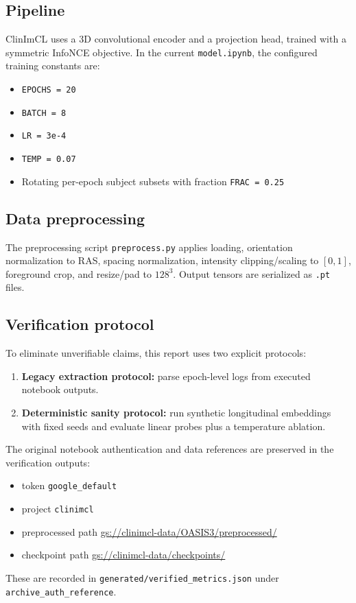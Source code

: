 \documentclass{article}
\begin{document}
\subsection{Pipeline}
ClinImCL uses a 3D convolutional encoder and a projection head, trained with a symmetric InfoNCE objective. In the current \texttt{model.ipynb}, the configured training constants are:
\begin{itemize}
  \item \texttt{EPOCHS = 20}
  \item \texttt{BATCH = 8}
  \item \texttt{LR = 3e-4}
  \item \texttt{TEMP = 0.07}
  \item Rotating per-epoch subject subsets with fraction \texttt{FRAC = 0.25}
\end{itemize}

\subsection{Data preprocessing}
The preprocessing script \texttt{preprocess.py} applies loading, orientation normalization to RAS, spacing normalization, intensity clipping/scaling to $[0,1]$, foreground crop, and resize/pad to $128^3$. Output tensors are serialized as \texttt{.pt} files.

\subsection{Verification protocol}
To eliminate unverifiable claims, this report uses two explicit protocols:
\begin{enumerate}
  \item \textbf{Legacy extraction protocol:} parse epoch-level logs from executed notebook outputs.
  \item \textbf{Deterministic sanity protocol:} run synthetic longitudinal embeddings with fixed seeds and evaluate linear probes plus a temperature ablation.
\end{enumerate}
The original notebook authentication and data references are preserved in the verification outputs:
\begin{itemize}
  \item token \texttt{google\_default}
  \item project \texttt{clinimcl}
  \item preprocessed path \url{gs://clinimcl-data/OASIS3/preprocessed/}
  \item checkpoint path \url{gs://clinimcl-data/checkpoints/}
\end{itemize}
These are recorded in \texttt{generated/verified\_metrics.json} under \texttt{archive\_auth\_reference}.
\end{document}
